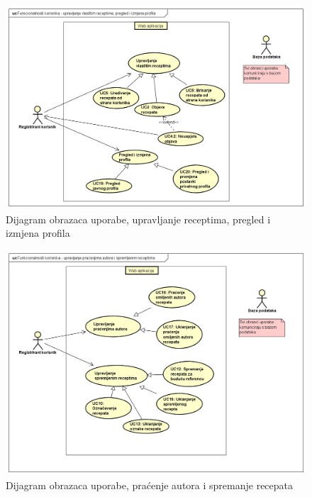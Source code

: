 					\begin{figure}[H]
						\includegraphics[scale= 0.42]{slike/UseCase Diagram2.png}
						\centering
						\caption{Dijagram obrazaca uporabe, upravljanje receptima, pregled i izmjena profila}
						\label{fig:Dijagram obrazaca uporabe, upravljanje receptima, pregled i izmjena profila}
					\end{figure}
					\begin{figure}[H]
						\includegraphics[scale= 0.42]{slike/UseCase Diagram3.png}
						\centering
						\caption{Dijagram obrazaca uporabe, praćenje autora i spremanje recepata}
						\label{fig:Dijagram obrazaca uporabe, praćenje autora i spremanje recepata}
					\end{figure}
